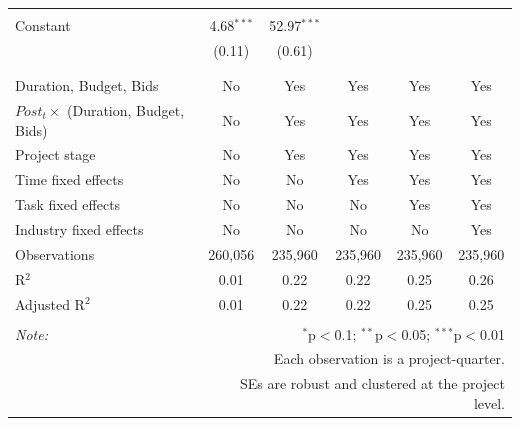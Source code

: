 \documentclass[
]{article}
\begin{document}
\begin{table}[H]
\begin{tabular}{@{\extracolsep{-2pt}}lccccc}
  & & & & & \\ 
 Constant & 4.68$^{***}$ & 52.97$^{***}$ &  &  &  \\ 
  & (0.11) & (0.61) &  &  &  \\ 
  & & & & & \\ 
\hline \\[-1.8ex] 
Duration, Budget, Bids & No & Yes & Yes & Yes & Yes \\ 
$Post_t \times $  (Duration, Budget, Bids) & No & Yes & Yes & Yes & Yes \\ 
Project stage & No & Yes & Yes & Yes & Yes \\ 
Time fixed effects & No & No & Yes & Yes & Yes \\ 
Task fixed effects & No & No & No & Yes & Yes \\ 
Industry fixed effects & No & No & No & No & Yes \\ 
Observations & 260,056 & 235,960 & 235,960 & 235,960 & 235,960 \\ 
R$^{2}$ & 0.01 & 0.22 & 0.22 & 0.25 & 0.26 \\ 
Adjusted R$^{2}$ & 0.01 & 0.22 & 0.22 & 0.25 & 0.25 \\ 
\hline 
\hline \\[-1.8ex] 
\textit{Note:}  & \multicolumn{5}{r}{$^{*}$p$<$0.1; $^{**}$p$<$0.05; $^{***}$p$<$0.01} \\ 
 & \multicolumn{5}{r}{Each observation is a project-quarter.} \\ 
 & \multicolumn{5}{r}{SEs are robust and clustered at the project level.} \\ 
\end{tabular} 
\end{table}
\end{document}
